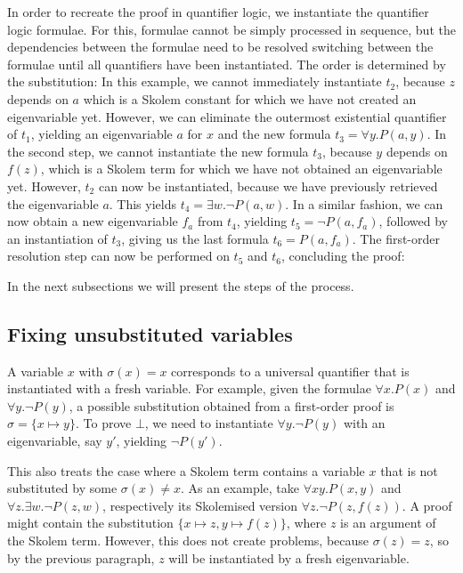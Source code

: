 \documentclass[]{article}
\begin{document}
In order to recreate the proof in quantifier logic, we instantiate the
quantifier logic formulae. For this, formulae cannot be simply processed
in sequence, but the dependencies between the formulae need to be
resolved switching between the formulae until all quantifiers have been
instantiated. The order is determined by the substitution: In this
example, we cannot immediately instantiate \(t_2\), because \(z\)
depends on \(a\) which is a Skolem constant for which we have not
created an eigenvariable yet. However, we can eliminate the outermost
existential quantifier of \(t_1\), yielding an eigenvariable \(a\) for
\(x\) and the new formula \(t_3 = \forall y. P(a, y)\). In the second
step, we cannot instantiate the new formula \(t_3\), because \(y\)
depends on \(f(z)\), which is a Skolem term for which we have not
obtained an eigenvariable yet. However, \(t_2\) can now be instantiated,
because we have previously retrieved the eigenvariable \(a\). This
yields \(t_4 = \exists w. \lnot P(a, w)\). In a similar fashion, we can
now obtain a new eigenvariable \(f_a\) from \(t_4\), yielding
\(t_5 = \lnot P(a, f_a)\), followed by an instantiation of \(t_3\),
giving us the last formula \(t_6 = P(a, f_a)\). The first-order
resolution step can now be performed on \(t_5\) and \(t_6\), concluding
the proof: 

In the next subsections we will present the steps of the process.

\subsection{Fixing unsubstituted
variables}\label{fixing-unsubstituted-variables}

A variable \(x\) with \(\sigma(x) = x\) corresponds to a universal
quantifier that is instantiated with a fresh variable. For example,
given the formulae \(\forall x. P(x)\) and \(\forall y. \lnot P(y)\), a
possible substitution obtained from a first-order proof is
\(\sigma = \{ x \mapsto y \}\). To prove \(\bot\), we need to
instantiate \(\forall y. \lnot P(y)\) with an eigenvariable, say \(y'\),
yielding \(\lnot P(y')\).

This also treats the case where a Skolem term contains a variable \(x\)
that is not substituted by some \(\sigma(x) \neq x\). As an example,
take \(\forall x y. P(x, y)\) and
\(\forall z. \exists w. \neg P(z, w)\), respectively its Skolemised
version \(\forall z. \neg P(z, f(z))\). A proof might contain the
substitution \(\{x \mapsto z, y \mapsto f(z) \}\), where \(z\) is an
argument of the Skolem term. However, this does not create problems,
because \(\sigma(z) = z\), so by the previous paragraph, \(z\) will be
instantiated by a fresh eigenvariable.
\end{document}
